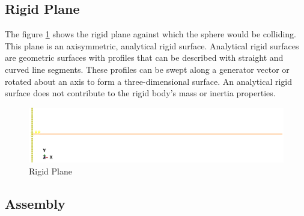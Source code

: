 \subsection{Rigid Plane}

The figure \ref{fig:plane} shows the rigid plane against which the sphere would be colliding. This plane is an axisymmetric, analytical rigid surface. Analytical rigid surfaces are geometric surfaces with profiles that can be described with straight and curved line segments. These profiles can be swept along a generator vector or rotated about an axis to form a three-dimensional surface. An analytical rigid surface does not contribute to the rigid body's mass or inertia properties.

\begin{figure}[H]
    \centering
	\includegraphics[scale=0.5]{../images/SimulationSetup/Plane.eps}
	\caption{Rigid Plane}
	\label{fig:plane}
\end{figure}


\subsection{Assembly}

